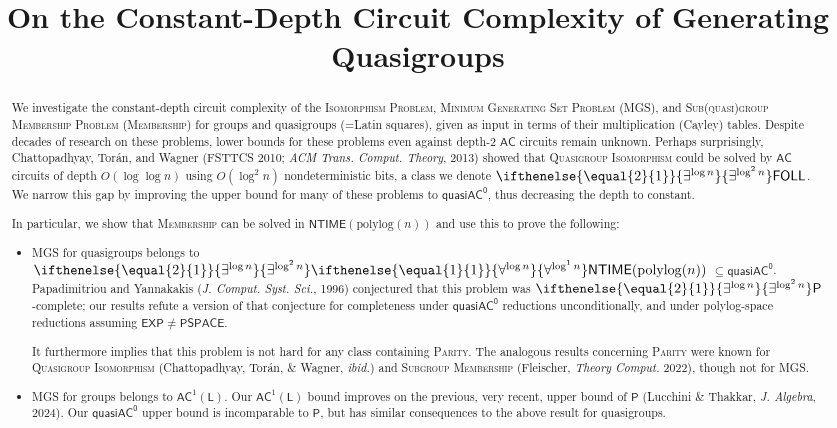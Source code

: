 \documentclass{theoretics}
\title{On the Constant-Depth Circuit Complexity of Generating Quasigroups}
\newcommand{\algprobm}[1]{\textsc{#1}\xspace}
\newcommand{\betacc}[1]{\ifthenelse{\equal{#1}{1}}{\exists^{\log n}}{\exists^{\log^{#1}n}}} %
\newcommand{\alphacc}[1]{\ifthenelse{\equal{#1}{1}}{\forall^{\log n}}{\forall^{\log^{#1}n}}} %
\newcommand*{\ComplexityClass}[1]{\ensuremath{\mathsf{#1}}\xspace}
\renewcommand{\P}{\ComplexityClass{P}}
\newcommand*{\EXP}{\ComplexityClass{EXP}}
\newcommand*{\LogSpace}{\ComplexityClass{L}}
\newcommand*{\PSPACE}{\ComplexityClass{PSPACE}}
\newcommand{\AC}{\ComplexityClass{AC}}
\newcommand{\qACz}{\ComplexityClass{quasiAC^0}}
\newcommand{\FOLL}{\ComplexityClass{FOLL}}
\newcommand{\NTIME}{\ComplexityClass{NTIME}}
\begin{document}
\maketitle

\begin{abstract}
We investigate the constant-depth 
circuit complexity 
of the \algprobm{Isomorphism Problem}, \algprobm{Minimum Generating Set Problem} (\algprobm{MGS}), and \algprobm{Sub(quasi)group Membership Problem} (\algprobm{Membership})  for groups and quasigroups (=Latin squares), given as input in terms of their multiplication (Cayley) tables.
Despite decades of research on these problems, lower bounds for these problems even against  depth-$2$ $\AC$ circuits remain unknown. Perhaps surprisingly, Chattopadhyay, Torán, and Wagner (FSTTCS 2010; \emph{ACM Trans. Comput. Theory}, 2013) showed that \algprobm{Quasigroup Isomorphism} could be solved by $\AC$ circuits of depth $O(\log \log n)$ using $O(\log^2 n)$ nondeterministic bits, a class we denote $\betacc{2}\FOLL$. We narrow this gap by improving the upper bound for many of these problems to $\qACz$, thus decreasing the depth to constant.

In particular, we show that \algprobm{Membership} can be solved in $\NTIME(\mathrm{polylog}(n))$ and use this to prove the following:
\begin{itemize}
\item \algprobm{MGS} for quasigroups belongs to $\betacc{2}\alphacc{1}\NTIME(\mathrm{polylog}(n))$ $\subseteq \qACz$. Papadimitriou and Yannakakis (\emph{J. Comput. Syst. Sci.}, 1996) conjectured that this problem was $\betacc{2}\P$-complete; our results refute a version of that conjecture for completeness under $\qACz$ reductions unconditionally, and under polylog-space reductions assuming $\EXP \neq \PSPACE$. 

It furthermore implies that this problem is not hard for any class containing \algprobm{Parity}. The analogous results concerning \algprobm{Parity} were known for \algprobm{Quasigroup Isomorphism} (Chattopadhyay, Tor\'an, \& Wagner, \emph{ibid.}) and \algprobm{Subgroup Membership} (Fleischer, \textit{Theory Comput.} 2022), though not for \algprobm{MGS}.

\item \algprobm{MGS} for groups belongs to $\AC^{1}(\LogSpace)$. Our $\AC^{1} (\LogSpace)$ bound improves on the previous, very recent, upper bound of $\mathsf{P}$ (Lucchini \& Thakkar, \textit{J. Algebra}, 2024). Our $\qACz$ upper bound is incomparable to $\P$, but has similar consequences to the above result for quasigroups. 


\end{itemize}
\end{abstract}
\end{document}
